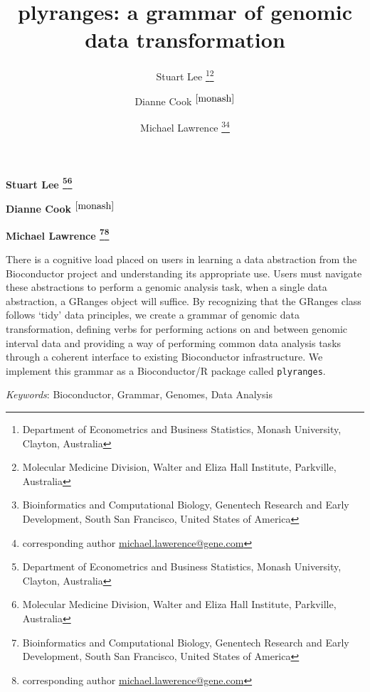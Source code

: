 \documentclass[]{article}
\title{plyranges: a grammar of genomic data transformation  }
\author{\Large Stuart Lee
\footnote{\label{monash}Department of Econometrics and Business Statistics, Monash University, Clayton, Australia}\footnote{Molecular Medicine Division, Walter and Eliza Hall Institute, Parkville, Australia}\vspace{0.05in} \newline\normalsize\emph{}   \and \Large Dianne Cook \(^{\ref{monash}}\)\vspace{0.05in} \newline\normalsize\emph{}   \and \Large Michael Lawrence
\footnote{Bioinformatics and Computational Biology, Genentech Research and Early Development, South San Francisco, United States of America}\footnote{corresponding author \href{mailto:michael.lawerence@gene.com}{michael.lawerence@gene.com} }\vspace{0.05in} \newline\normalsize\emph{}  }
\date{}
\newcommand*{\authorfont}{\fontfamily{phv}\selectfont}
\renewenvironment{abstract}
 {{%
    \setlength{\leftmargin}{0mm}
    \setlength{\rightmargin}{\leftmargin}%
  }%
  \relax}
 {\endlist}
\begin{document}
	
%

{%
\setlength{\parindent}{0pt}
\thispagestyle{plain}
{\fontsize{18}{20}\selectfont\raggedright 
\maketitle  %

}

{
   \vskip 13.5pt\relax \normalsize\fontsize{11}{12} 
\textbf{\authorfont Stuart Lee
\footnote{\label{monash}Department of Econometrics and Business Statistics, Monash University, Clayton, Australia}\footnote{Molecular Medicine Division, Walter and Eliza Hall Institute, Parkville, Australia}} \hskip 15pt \emph{\small }   \par \textbf{\authorfont Dianne Cook \(^{\ref{monash}}\)} \hskip 15pt \emph{\small }   \par \textbf{\authorfont Michael Lawrence
\footnote{Bioinformatics and Computational Biology, Genentech Research and Early Development, South San Francisco, United States of America}\footnote{corresponding author \href{mailto:michael.lawerence@gene.com}{michael.lawerence@gene.com} }} \hskip 15pt \emph{\small }   

}

}








\begin{abstract}

    \hbox{\vrule height .2pt width 39.14pc}

    \vskip 8.5pt %

\noindent There is a cognitive load placed on users in learning a data abstraction
from the Bioconductor project and understanding its appropriate use.
Users must navigate these abstractions to perform a genomic analysis
task, when a single data abstraction, a GRanges object will suffice. By
recognizing that the GRanges class follows `tidy' data principles, we
create a grammar of genomic data transformation, defining verbs for
performing actions on and between genomic interval data and providing a
way of performing common data analysis tasks through a coherent
interface to existing Bioconductor infrastructure. We implement this
grammar as a Bioconductor/R package called \texttt{plyranges}.


\vskip 8.5pt \noindent \emph{Keywords}: Bioconductor, Grammar, Genomes, Data Analysis \par

    \hbox{\vrule height .2pt width 39.14pc}



\end{abstract}
\end{document}
